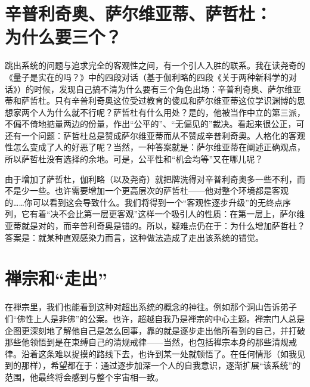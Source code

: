 \section{辛普利奇奥、萨尔维亚蒂、萨哲杜：\\为什么要三个？}

跳出系统的问题与追求完全的客观性之间，有一个引人入胜的联系。我在读尧奇的《量子是实在的吗？》中的四段对话（基于伽利略的四段《关于两种新科学的对话》）的时候，发现自己搞不清为什么要有三个角色出场：辛普利奇奥、萨尔维亚蒂和萨哲杜。只有辛普利奇奥这位受过教育的傻瓜和萨尔维亚蒂这位学识渊博的思想家两个人为什么就不行呢？萨哲杜有什么用处？是的，他被当作中立的第三派，不偏不倚地掂量两边的份量，作出“公平的”、“无偏见的”裁决。看起来很公正，可还有一个问题：萨哲杜总是赞成萨尔维亚蒂而从不赞成辛普利奇奥。人格化的客观性怎么变成了人的好恶了呢？当然，一种答案就是：萨尔维亚蒂在阐述正确观点，所以萨哲杜没有选择的余地。可是，公平性和“机会均等”又在哪儿呢？

由于增加了萨哲杜，伽利略（以及尧奇）就把牌洗得对辛普利奇奥多一些不利，而不是少一些。也许需要增加一个更高层次的萨哲杜——他对整个环境都是客观的……你可以看到这会导致什么。我们将得到一个“客观性逐步升级”的无终点序列，它有着“决不会比第一层更客观”这样一个吸引人的性质：在第一层上，萨尔维亚蒂就是对的，而辛普利奇奥是错的。所以，疑难点仍在于：为什么增加萨哲杜？答案是：就某种直观感染力而言，这种做法造成了走出该系统的错觉。

\section{禅宗和“走出”}

在禅宗里，我们也能看到这种对超出系统的概念的神往。例如那个洞山告诉弟子们“佛性上人是非佛”的公案。也许，超越自我乃是禅宗的中心主题。禅宗门人总是企图更深刻地了解他自己是怎么回事，靠的就是逐步走出他所看到的自己，并打破那些他领悟到是在束缚自己的清规戒律——当然，也包括禅宗本身的那些清规戒律。沿着这条难以捉摸的路线下去，也许到某一处就顿悟了。在任何情形（如我见到的那样），希望都在于：通过逐步加深一个人的自我意识，逐渐扩展“该系统”的范围，他最终将会感到与整个宇宙相一致。
